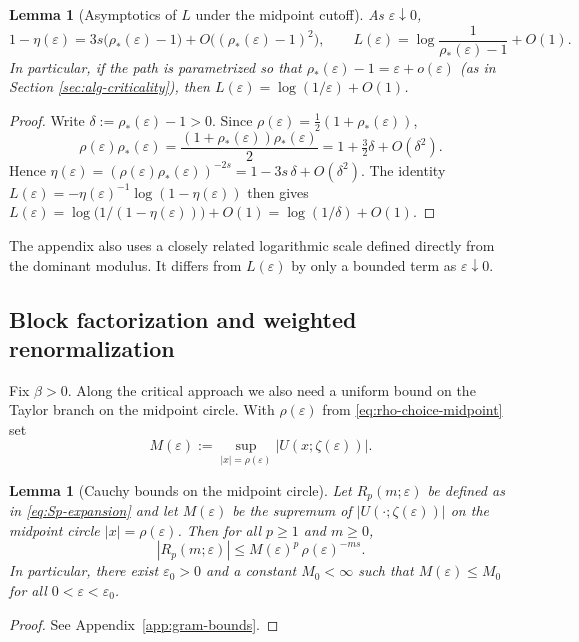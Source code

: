 \documentclass[11pt]{amsart}
\numberwithin{equation}{section}
\theoremstyle{plain}
\newtheorem{lemma}[theorem]{Lemma}
\theoremstyle{definition}
\theoremstyle{remark}
\begin{document}
\begin{lemma}[Asymptotics of $L$ under the midpoint cutoff]
	\label{lem:Lambda-asymp}
	As $\varepsilon\downarrow0$,
	\begin{equation}\label{eq:Lambda-asymp-statement}
		1-\eta(\varepsilon)
		=3s\bigl(\rho_*(\varepsilon)-1\bigr)
		+O\bigl((\rho_*(\varepsilon)-1)^2\bigr),
		\qquad
		L(\varepsilon)
		=\log\!\frac{1}{\rho_*(\varepsilon)-1}+O(1).
	\end{equation}
	In particular, if the path is parametrized so that
	$\rho_*(\varepsilon)-1=\varepsilon+o(\varepsilon)$
	(as in Section \ref{sec:alg-criticality}), then
	$L(\varepsilon)=\log(1/\varepsilon)+O(1)$.
\end{lemma}

\begin{proof}
	Write $\delta:=\rho_*(\varepsilon)-1>0$. Since
	$\rho(\varepsilon)=\tfrac12(1+\rho_*(\varepsilon))$,
	\[
		\rho(\varepsilon)\rho_*(\varepsilon)
		=\frac{(1+\rho_*(\varepsilon))\rho_*(\varepsilon)}{2}
		=1+\tfrac{3}{2}\delta+O(\delta^2).
	\]
	Hence
	$\eta(\varepsilon)=(\rho(\varepsilon)\rho_*(\varepsilon))^{-2s}
		=1-3s\,\delta+O(\delta^2)$.
	The identity
	$L(\varepsilon)=-\eta(\varepsilon)^{-1}\log(1-\eta(\varepsilon))$
	then gives
	$L(\varepsilon)
		=\log\bigl(1/(1-\eta(\varepsilon))\bigr)+O(1)
		=\log(1/\delta)+O(1)$.
\end{proof}

The appendix also uses a closely related logarithmic scale defined directly
from the dominant modulus. It differs from \(L(\varepsilon)\) by only a bounded
term as \(\varepsilon\downarrow0\).

\subsection{Block factorization and weighted renormalization}\label{subsec:weighted-space}

Fix $\beta>0$.  Along the critical approach we also need a uniform bound on the Taylor branch on the midpoint circle.
With $\rho(\varepsilon)$ from \eqref{eq:rho-choice-midpoint} set
\[
	M(\varepsilon):=\sup_{|x|=\rho(\varepsilon)}|U(x;\zeta(\varepsilon))|.
\]
\begin{lemma}[Cauchy bounds on the midpoint circle]
	\label{lem:cauchy-Rp}
	Let $R_p(m;\varepsilon)$ be defined as in \eqref{eq:Sp-expansion} and let $M(\varepsilon)$ be the
	supremum of $|U(\cdot;\zeta(\varepsilon))|$ on the midpoint circle $|x|=\rho(\varepsilon)$.
	Then for all $p\ge1$ and $m\ge0$,
	\[
		|R_p(m;\varepsilon)|\le M(\varepsilon)^p\,\rho(\varepsilon)^{-ms}.
	\]
	In particular, there exist $\varepsilon_0>0$ and a constant $M_0<\infty$ such that
	$M(\varepsilon)\le M_0$ for all $0<\varepsilon<\varepsilon_0$.
\end{lemma}
\begin{proof}
	See Appendix~\ref{app:gram-bounds}.
\end{proof}
\end{document}
